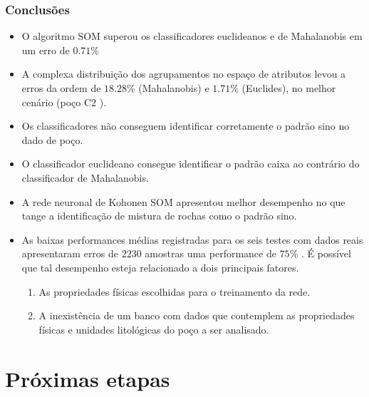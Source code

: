 \documentclass[aspectratio=10]{beamer} %
\begin{document}
\begin{frame}
\frametitle{Conclusões}

\begin{small}


	\begin{itemize}
		\footnotesize
		\item O algoritmo SOM superou os classificadores euclideanos e de Mahalanobis em um erro de $0.71\%$
		\pause
		\item A complexa distribuição dos agrupamentos no espaço de atributos levou a erros da ordem de $18.28\%$ (Mahalanobis) e $1.71\%$ (Euclides), no melhor cenário (poço C$2$ ).
		\pause
		\item Os classificadores não conseguem identificar corretamente o padrão sino no dado de poço. 
		\pause
		\item O classificador euclideano consegue identificar o padrão caixa ao contrário do classificador de Mahalanobis.
		\pause
		\item A rede neuronal de Kohonen SOM apresentou melhor desempenho no que tange a identificação de mistura de rochas como o padrão sino.
		\pause
		\item As baixas performances médias registradas para os seis testes com dados reais apresentaram erros de $2230$ amostras uma performance de $75\%$ . É possível que tal desempenho esteja relacionado a dois principais fatores.
		\pause
		\begin{enumerate}
			\footnotesize
			\item As propriedades físicas escolhidas para o treinamento da rede.
			\pause
			\item A inexistência de um banco com dados que contemplem as propriedades físicas e unidades litológicas do poço a ser analisado.
		\end{enumerate}
		
	\end{itemize}

\end{small}	
\end{frame}

\section{Próximas etapas}
\end{document}
